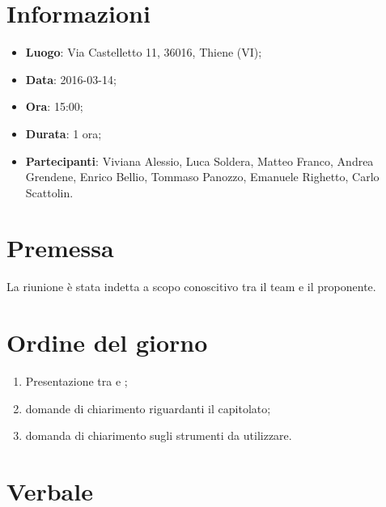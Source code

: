 \documentclass[a4paper,titlepage]{article}
\begin{document}
\maketitle

\newpage
\tableofcontents

\newpage
\section{Informazioni}
\label{sec:Informazioni}

\begin{itemize}
  \item \textbf{Luogo}: Via Castelletto 11, 36016, Thiene (VI);
  \item \textbf{Data}: 2016-03-14;
  \item \textbf{Ora}: 15:00;
  \item \textbf{Durata}: 1 ora;
  \item \textbf{Partecipanti}: Viviana Alessio, Luca Soldera, Matteo Franco, Andrea Grendene, Enrico Bellio, Tommaso Panozzo, Emanuele Righetto, Carlo Scattolin.
\end{itemize}

\newpage
\section{Premessa}

La riunione è stata indetta a scopo conoscitivo tra il team e il proponente.

\section{Ordine del giorno}
\label{sec:OrdineDelGiorno}

\begin{enumerate}
  \item Presentazione tra \AUTORE{} e \PROPONENTE;
  \item domande di chiarimento riguardanti il capitolato;
  \item domanda di chiarimento sugli strumenti da utilizzare.
\end{enumerate}

\newpage
\section{Verbale}
\label{sec:Verbale}
\end{document}
